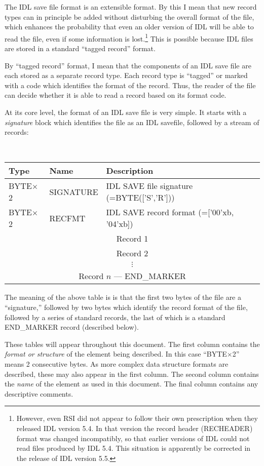 \documentclass[12pt]{article}
\def\recb#1#2{\bigskip\begin{center}\par\noindent{Format: \bf #1}\qquad{\tt #2}\nopagebreak\\[0.05in]\nopagebreak
\begin{tabular}{|p{1.0in}|l|p{3.5in}|}\hline
{\bf Type} & {\bf Name} & {\bf Description}\\\hline}
\def\rece{\end{tabular}\end{center}\medskip}
\def\recl#1#2#3{{#2} & {#1} & {#3}\\\hline}
\def\tx{$\times$}
\begin{document}
The IDL save file format is an extensible format.  By this I mean that
new record types can in principle be added without disturbing the
overall format of the file, which enhances the probability that even
an older version of IDL will be able to read the file, even if some
information is lost.\footnote{However, even RSI did not appear to
follow their own prescription when they released IDL version 5.4.  In
that version the record header (RECHEADER) format was changed
incompatibly, so that earlier versions of IDL could not read files
produced by IDL 5.4.  This situation is apparently be corrected in
the release of IDL version 5.5.}  This is possible because IDL files
are stored in a standard ``tagged record'' format.

By ``tagged record'' format, I mean that the components of an IDL save
file are each stored as a separate record type.  Each record type is
``tagged'' or marked with a code which identifies the format of the
record.  Thus, the reader of the file can decide whether it is able to
read a record based on its format code.  

At its core level, the format of an IDL save file is very simple.  It
starts with a {\it signature} block which identifies the file as an
IDL savefile, followed by a stream of records:

\recb{SAVEFMT}{(overall save file format)}
\recl{SIGNATURE}{BYTE\tx 2}{IDL SAVE file signature (=BYTE(['S','R']))}
\recl{RECFMT}{BYTE\tx 2}{IDL SAVE record format (=['00'xb, '04'xb])}
\multicolumn{3}{|c|}{Record 1}\\\hline
\multicolumn{3}{|c|}{Record 2}\\\hline
\multicolumn{3}{|c|}{$\vdots$}\\\hline
\multicolumn{3}{|c|}{Record $n$ --- END\_MARKER}\\\hline
\rece

The meaning of the above table is is that the first two bytes of the
file are a ``signature,'' followed by two bytes which identify the
record format of the file, followed by a series of standard records,
the last of which is a standard END\_MARKER record (described below).

These tables will appear throughout this document.  The first column
contains the {\it format or structure} of the element being described.
In this case ``BYTE\tx 2'' means 2 consecutive bytes.  As more complex
data structure formats are described, these may also appear in the
first column.  The second column contains the {\it name} of the
element as used in this document.  The final column contains any
descriptive comments.
\end{document}
